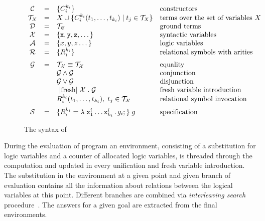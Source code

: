 \begin{figure}[t]
\centering
\[
\begin{array}{ccll}
  \mathcal{C} & = & \{C_i^{k_i}\} & \mbox{constructors} \\
  \mathcal{T}_X & = & X \cup \{C_i^{k_i} (t_1, \dots, t_{k_i}) \mid t_j\in\mathcal{T}_X\} & \mbox{terms over the set of variables $X$} \\
  \mathcal{D} & = & \mathcal{T}_\emptyset & \mbox{ground terms}\\
  \mathcal{X} & = & \{ \ttt{x}, \ttt{y}, \ttt{z}, \dots \} & \mbox{syntactic variables} \\
  \mathcal{A} & = & \{ x, y, z \dots \} & \mbox{logic variables} \\
  \mathcal{R} & = & \{ R_i^{k_i}\} &\mbox{relational symbols with arities} \\[2mm]
  \mathcal{G} & = & \mathcal{T_X}\equiv\mathcal{T_X}   &  \mbox{equality} \\
              &   & \mathcal{G}\wedge\mathcal{G}     & \mbox{conjunction} \\
              &   & \mathcal{G}\vee\mathcal{G}       &\mbox{disjunction} \\
              &   & \mbox{\lstinline|fresh|}\;\mathcal{X}\;.\;\mathcal{G} & \mbox{fresh variable introduction} \\
              &   & R_i^{k_i} (t_1,\dots,t_{k_i}),\;t_j\in\mathcal{T_X} & \mbox{relational symbol invocation} \\[2mm]
  \mathcal{S} & = & \{R_i^{k_i} = \lambda\;\ttt{x}_1^i\dots \ttt{x}_{k_i}^i\,.\, g_i;\}\; g & \mbox{specification}
\end{array}
\]
\caption{The syntax of \mK}
\label{fig:syntax}
\end{figure}

During the evaluation of \mK program an environment, consisting of a substitution for logic variables and a counter of allocated logic
variables, is threaded through the computation and updated in every unification and fresh variable introduction.
The substitution in the environment at a given point and given branch of evaluation contains all the information about relations between
the logical variables at this point.
Different branches are combined via \emph{interleaving search} procedure~\cite{Transformers}.
The answers for a given goal are extracted from the final environments.

